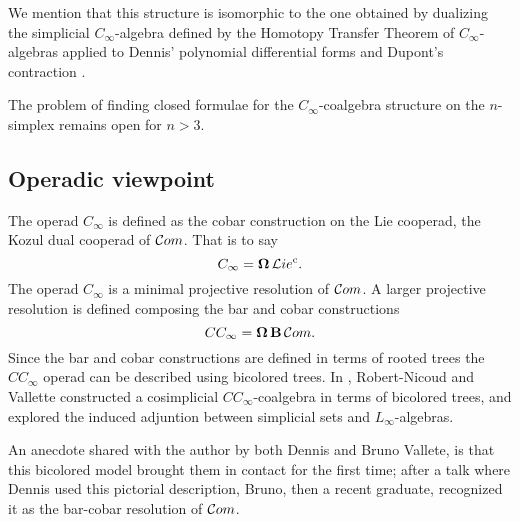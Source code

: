 We mention that this structure is isomorphic to the one obtained by dualizing the simplicial $C_\infty$-algebra defined by the Homotopy Transfer Theorem of $C_\infty$-algebras applied to Dennis' polynomial differential forms and Dupont's contraction \cite{getzler2008transfering}.

The problem of finding closed formulae for the $C_\infty$-coalgebra structure on the $n$-simplex remains open for $n > 3$.

\subsection{Operadic viewpoint}

The operad $C_\infty$ is defined as the cobar construction on the Lie cooperad, the Kozul dual cooperad of $\mathcal{C}om$.
That is to say
\[
C_\infty = \operatorname{\mathbf{\Omega}} \mathcal{L}ie^{\mathrm c}.
\]
The operad $C_\infty$ is a minimal projective resolution of $\mathcal{C}om$.
A larger projective resolution is defined composing the bar and cobar constructions
\[
CC_\infty = \operatorname{\mathbf{\Omega}} \operatorname{\mathbf{B}} \mathcal{C}om.
\]
Since the bar and cobar constructions are defined in terms of rooted trees the $CC_\infty$ operad can be described using bicolored trees.
In \cite{vallette2020higherlietheory}, Robert-Nicoud and Vallette constructed a cosimplicial $CC_\infty$-coalgebra in terms of bicolored trees, and explored the induced adjuntion between simplicial sets and $L_\infty$-algebras.

An anecdote shared with the author by both Dennis and Bruno Vallete, is that this bicolored model brought them in contact for the first time; after a talk where Dennis used this pictorial description, Bruno, then a recent graduate, recognized it as the bar-cobar resolution of $\mathcal{C}om$.